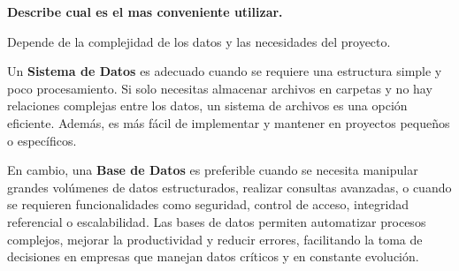\begin{center}
    \textbf{Describe cual es el mas conveniente utilizar.}
    \vspace{.5cm}
\end{center}

Depende de la complejidad de los datos y las necesidades del proyecto.

Un \textbf{Sistema de Datos} es adecuado cuando se requiere una estructura simple y poco procesamiento. Si solo necesitas almacenar archivos en carpetas y no hay relaciones complejas entre los datos, un sistema de archivos es una opción eficiente. Además, es más fácil de implementar y mantener en proyectos pequeños o específicos.

En cambio, una \textbf{Base de Datos} es preferible cuando se necesita manipular grandes volúmenes de datos estructurados, realizar consultas avanzadas, o cuando se requieren funcionalidades como seguridad, control de acceso, integridad referencial o escalabilidad. Las bases de datos permiten automatizar procesos complejos, mejorar la productividad y reducir errores, facilitando la toma de decisiones en empresas que manejan datos críticos y en constante evolución.\\

\cite{sooluciona}
\vspace{.5cm}
